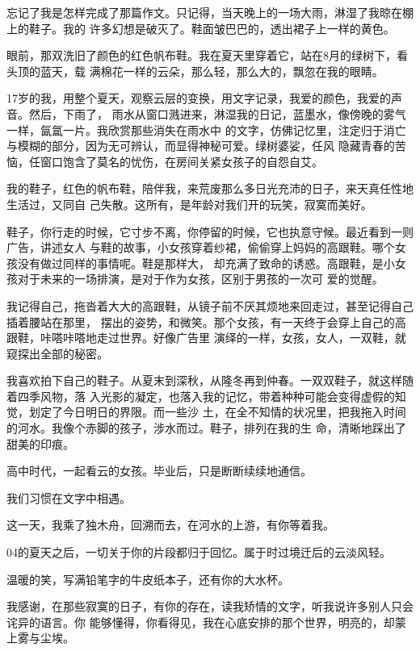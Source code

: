 		忘记了我是怎样完成了那篇作文。只记得，当天晚上的一场大雨，淋湿了我晾在棚上的鞋子。我的
	许多幻想是破灭了。鞋面皱巴巴的，透出裙子上一样的黄色。

		眼前，那双洗旧了颜色的红色帆布鞋。我在夏天里穿着它，站在8月的绿树下，看头顶的蓝天，载
	满棉花一样的云朵，那么轻，那么大的，飘忽在我的眼睛。

		17岁的我，用整个夏天，观察云层的变换，用文字记录，我爱的颜色，我爱的声音。然后，下雨了，
	雨水从窗口溅进来，淋湿我的日记，蓝墨水，像傍晚的雾气一样，氤氲一片。我欣赏那些消失在雨水中
	的文字，仿佛记忆里，注定归于消亡与模糊的部分，因为无可辨认，而显得神秘可爱。绿树婆娑，任风
	隐藏青春的苦恼，任窗口饱含了莫名的忧伤，在房间关紧女孩子的自怨自艾。

		我的鞋子，红色的帆布鞋，陪伴我，来荒废那么多日光充沛的日子，来天真任性地生活过，又同自
	己失散。这所有，是年龄对我们开的玩笑，寂寞而美好。

		鞋子，你行走的时候，它寸步不离，你停留的时候，它也执意守候。最近看到一则广告，讲述女人
	与鞋的故事，小女孩穿着纱裙，偷偷穿上妈妈的高跟鞋。哪个女孩没有做过同样的事情呢。鞋是那样大，
	却充满了致命的诱惑。高跟鞋，是小女孩对于未来的一场排演，是对于作为女孩，区别于男孩的一次可
	爱的觉醒。

		我记得自己，拖沓着大大的高跟鞋，从镜子前不厌其烦地来回走过，甚至记得自己插着腰站在那里，
	摆出的姿势，和微笑。那个女孩，有一天终于会穿上自己的高跟鞋，咔嗒咔嗒地走过世界。好像广告里
	演绎的一样，女孩，女人，一双鞋，就窥探出全部的秘密。

		我喜欢拍下自己的鞋子。从夏末到深秋，从隆冬再到仲春。一双双鞋子，就这样随着四季风物，落
	入光影的凝定，也落入我的记忆，带着种种可能会变得虚假的知觉，划定了今日明日的界限。而一些沙
	土，在全不知情的状况里，把我拖入时间的河水。我像个赤脚的孩子，涉水而过。鞋子，排列在我的生
	命，清晰地踩出了甜美的印痕。

	\endwriting



		高中时代，一起看云的女孩。毕业后，只是断断续续地通信。

		我们习惯在文字中相遇。

		这一天，我乘了独木舟，回溯而去，在河水的上游，有你等着我。

		04的夏天之后，一切关于你的片段都归于回忆。属于时过境迁后的云淡风轻。

		温暖的笑，写满铅笔字的牛皮纸本子，还有你的大水杯。

		我感谢，在那些寂寞的日子，有你的存在，读我矫情的文字，听我说许多别人只会诧异的语言。你
	能够懂得，你看得见，我在心底安排的那个世界，明亮的，却蒙上雾与尘埃。


